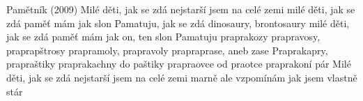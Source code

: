 \begin{TEXT}{Pamětník (2009)}
\SLOKA Milé děti, jak se zdá
nejstarší jsem na celé zemi
milé děti, jak se zdá
paměť mám jak slon
\SLOKA Pamatuju, jak se zdá
dinosaury, brontosaury
milé děti, jak se zdá
paměť mám jak on, ten slon
\SLOKA  Pamatuju praprakozy
prapravosy, praprapštrosy
prapramoly, prapravoly
prapraprase, aneb zase
\SLOKA  Praprakapry, prapraštiky
praprakachny do paštiky
prapraovce od praotce
praprakoní pár
\SLOKA  Milé děti, jak se zdá
nejstarší jsem na celé zemi
marně ale vzpomínám
jak jsem vlastně stár
\end{TEXT}